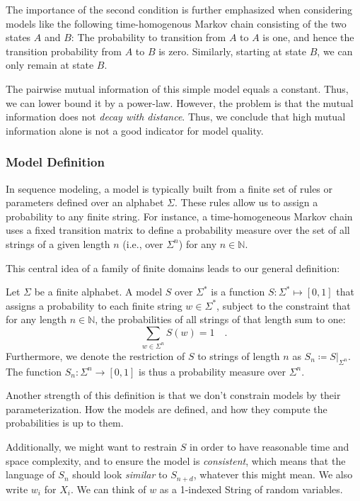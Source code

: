 \documentclass[../../main.tex]{subfiles}
\begin{document}
    The importance of the second condition is further emphasized when considering models like the following time-homogenous Markov chain consisting of the two states $A$ and $B$: The probability to transition from $A$ to $A$ is one, and hence the transition probability from $A$ to $B$ is zero. Similarly, starting at state $B$, we can only remain at state $B$.
    
    The pairwise mutual information of this simple model equals a constant. Thus, we can lower bound it by a power-law. However, the problem is that the mutual information does not \emph{decay with distance}. Thus, we conclude that high mutual information alone is not a good indicator for model quality.

\subsubsection{Model Definition}
    In sequence modeling, a model is typically built from a finite set of rules or parameters defined over an alphabet $\Sigma$. These rules allow us to assign a probability to any finite string. For instance, a time-homogeneous Markov chain uses a fixed transition matrix to define a probability measure over the set of all strings of a given length $n$ (i.e., over $\Sigma^n$) for any $n \in \mathbb{N}$.

    This central idea of a family of finite domains leads to our general definition:

    \begin{definition}
        \label{definition:model_over_sigma_star}
        Let $\Sigma$ be a finite alphabet. A model $S$ over $\Sigma^*$ is a function $S: \Sigma^* \mapsto [0, 1]$ that assigns a probability to each finite string $w \in \Sigma^*$, subject to the constraint that for any length $n \in \mathbb{N}$, the probabilities of all strings of that length sum to one:
        \[
            \sum_{w \in \Sigma^n} S(w) = 1 \quad .
        \]
        Furthermore, we denote the restriction of $S$ to strings of length $n$ as $S_n \coloneqq S|_{\Sigma^n}$. The function $S_n: \Sigma^n \to [0,1]$ is thus a probability measure over $\Sigma^n$.
    \end{definition}

    Another strength of this definition is that we don't constrain models by their parameterization. How the models are defined, and how they compute the probabilities is up to them.

    Additionally, we might want to restrain $S$ in order to have reasonable time and space complexity, and to ensure the model is \emph{consistent}, which means that the language of $S_n$ should look \emph{similar} to $S_{n + d}$, whatever this might mean. We also write $w_i$ for $X_i$. We can think of $w$ as a 1-indexed String of random variables.
\end{document}
